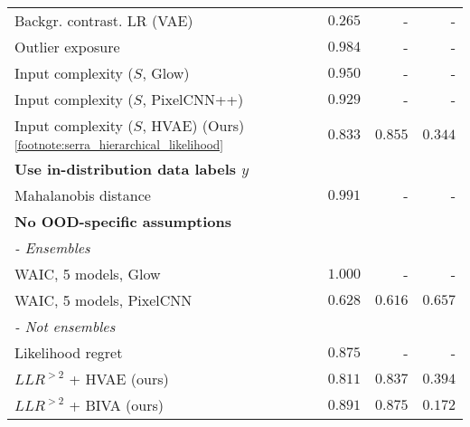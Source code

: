 {\begin{table}
{\begin{tabular}{lrrr}
Backgr. contrast. LR (VAE) {\parencite{xiao_likelihood_2020}}                    & $0.265$ & - & - \\
Outlier exposure {\parencite{hendrycks_deep_2019}}                              & $0.984$ & - & - \\
Input complexity ($S$, Glow) \parencite{serra_input_2020}                   & $0.950$ & - & - \\
Input complexity ($S$, PixelCNN++) \parencite{serra_input_2020}             & $0.929$ & - & - \\
Input complexity ($S$, HVAE) (Ours) \parencite{serra_input_2020}\textsuperscript{\ref{footnote:serra_hierarchical_likelihood}} & $0.833$ & $0.855$ & $0.344$ \\
\multicolumn{4}{l}{\textbf{Use in-distribution data labels $y$}} \\
Mahalanobis distance {\parencite{lee_simple_2018}}                          & $0.991$ & - & -  \\
         \multicolumn{4}{l}{\textbf{No OOD-specific assumptions}} \\
         \multicolumn{4}{l}{\textit{- Ensembles}} \\
WAIC, 5 models, Glow {\parencite{choi_waic_2019}}                          & $1.000$ & - & - \\
WAIC, 5 models, PixelCNN {\parencite{ren_likelihood_2019}}                      & $0.628$ & $0.616$ & $0.657$ \\
         \multicolumn{4}{l}{\textit{- Not ensembles}} \\
Likelihood regret \parencite{xiao_likelihood_2020}                               & $0.875$ & - & - \\
$LLR^{>2}$ + HVAE (ours)                            & $0.811$ & $0.837$ & $0.394$ \\
$LLR^{>2}$ + BIVA (ours)                            & $\mathbf{0.891}$ & $\mathbf{0.875}$ & $\mathbf{0.172}$ \\
         \bottomrule
    \end{tabular}%
    }
    \label{tab_hierarchical:rocauc-ood}
\end{table}

}
